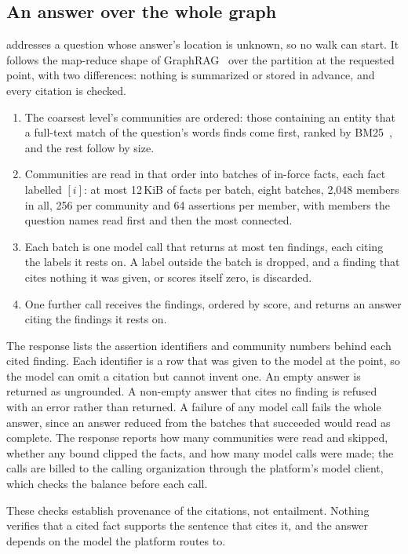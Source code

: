 \subsection{An answer over the whole graph}

\shipped{}  addresses a question whose answer's location is unknown,
so no walk can start. It follows the map-reduce shape of
GraphRAG~\cite{edge2024graphrag} over the partition at the requested point, with
two differences: nothing is summarized or stored in advance, and every citation
is checked.

\begin{enumerate}[leftmargin=*,itemsep=2pt]
\item The coarsest level's communities are ordered: those containing an entity
  that a full-text match of the question's words finds come first, ranked by
  BM25~\cite{robertson2009bm25}, and the rest follow by size.
\item Communities are read in that order into batches of in-force facts, each
  fact labelled $[i]$: at most 12\,KiB of facts per batch, eight batches, 2{,}048
  members in all, 256 per community and 64 assertions per member, with members
  the question names read first and then the most connected.
\item Each batch is one model call that returns at most ten findings, each citing
  the labels it rests on. A label outside the batch is dropped, and a finding
  that cites nothing it was given, or scores itself zero, is discarded.
\item One further call receives the findings, ordered by score, and returns an
  answer citing the findings it rests on.
\end{enumerate}

The response lists the assertion identifiers and community numbers behind each
cited finding. Each identifier is a row that was given to the model at the
point, so the model can omit a citation but cannot invent one. An empty answer
is returned as ungrounded. A non-empty answer that cites no finding is refused
with an error rather than returned. A failure of any model call fails the whole
answer, since an answer reduced from the batches that succeeded would read as
complete. The response reports how many communities were read and skipped,
whether any bound clipped the facts, and how many model calls were made; the
calls are billed to the calling organization through the platform's model
client, which checks the balance before each call.

These checks establish provenance of the citations, not entailment. Nothing
verifies that a cited fact supports the sentence that cites it, and the answer
depends on the model the platform routes to.
